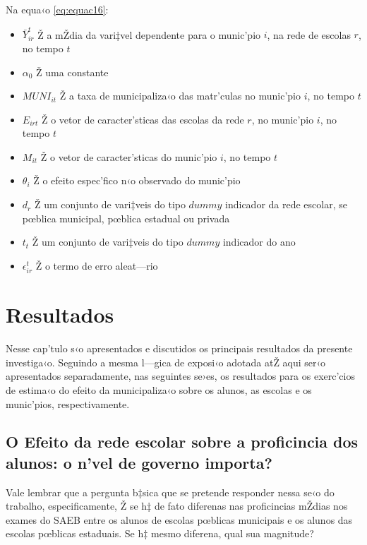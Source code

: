 \documentclass[a4paper, 12pt]{article}
\begin{document}
Na equa‹o \ref{eq:equac16}:
\begin{itemize}
\item $\bar Y_{ir}^{t}$ Ž a mŽdia da vari‡vel dependente para o munic’pio $i$, na rede de escolas $r$, no tempo $t$
\item$\alpha_0$ Ž uma constante
\item$MUNI_{it}$ Ž a taxa de municipaliza‹o das matr’culas no munic’pio $i$, no tempo $t$
\item$E_{irt}$ Ž o vetor de caracter’sticas das escolas da rede $r$, no munic’pio $i$, no tempo $t$
\item$M_{it}$ Ž o vetor de caracter’sticas do munic’pio $i$, no tempo $t$
\item$\theta_{i}$ Ž o efeito espec’fico n‹o observado do munic’pio
\item$d_{r}$ Ž um conjunto de vari‡veis do tipo $dummy$ indicador da rede escolar, se pœblica municipal, pœblica estadual ou privada
\item$t_{t}$ Ž um conjunto de vari‡veis do tipo $dummy$ indicador do ano
\item$\epsilon_{ir}^{t}$ Ž o termo de erro aleat—rio 
\end{itemize}
 
\pagebreak





\section{Resultados}

Nesse cap’tulo s‹o apresentados e discutidos os principais resultados da presente investiga‹o. Seguindo a mesma l—gica de exposi‹o adotada atŽ aqui ser‹o apresentados separadamente, nas seguintes se›es, os resultados para os exerc’cios de estima‹o do efeito da municipaliza‹o sobre os alunos, as escolas e os munic’pios, respectivamente. 

\subsection{O Efeito da rede escolar sobre a proficincia dos alunos: o n’vel de governo importa?}

Vale lembrar que a pergunta b‡sica que se pretende responder nessa se‹o do trabalho, especificamente, Ž se h‡ de fato diferenas nas proficincias mŽdias nos exames do SAEB entre os alunos de escolas pœblicas municipais e os alunos das escolas pœblicas estaduais. Se h‡ mesmo diferena, qual sua magnitude?
\end{document}
